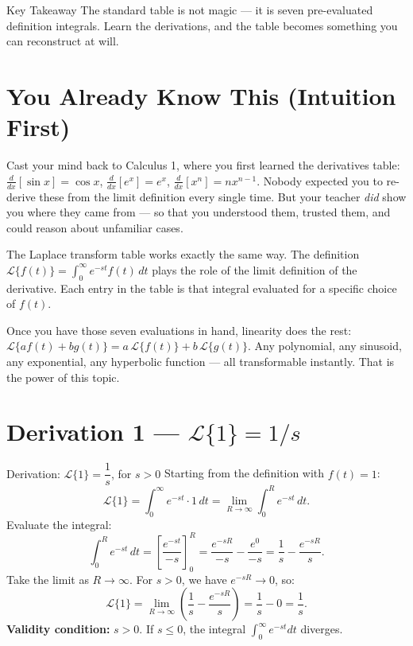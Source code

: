 \documentclass[12pt,a4paper]{article}
\begin{document}
\begin{learnbox}{Key Takeaway}
The standard table is not magic --- it is seven pre-evaluated definition integrals.
Learn the derivations, and the table becomes something you can reconstruct at will.
\end{learnbox}

\section{You Already Know This (Intuition First)}

Cast your mind back to Calculus 1, where you first learned the derivatives table:
$\frac{d}{dx}[\sin x] = \cos x$, $\frac{d}{dx}[e^x] = e^x$, $\frac{d}{dx}[x^n] = nx^{n-1}$.
Nobody expected you to re-derive these from the limit definition every single time.
But your teacher \emph{did} show you where they came from --- so that you understood them,
trusted them, and could reason about unfamiliar cases.

The Laplace transform table works exactly the same way. The definition
$\mathcal{L}\{f(t)\} = \int_0^\infty e^{-st} f(t)\, dt$ plays the role of the limit
definition of the derivative. Each entry in the table is that integral evaluated for
a specific choice of $f(t)$.

Once you have those seven evaluations in hand, linearity does the rest:
$\mathcal{L}\{af(t) + bg(t)\} = a\,\mathcal{L}\{f(t)\} + b\,\mathcal{L}\{g(t)\}$.
Any polynomial, any sinusoid, any exponential, any hyperbolic function --- all
transformable instantly. That is the power of this topic.

\section{Derivation 1 --- \texorpdfstring{$\mathcal{L}\{1\} = 1/s$}{L{1} = 1/s}}

\begin{infobox}{Derivation: $\mathcal{L}\{1\} = \dfrac{1}{s}$, for $s > 0$}
Starting from the definition with $f(t) = 1$:
\[
  \mathcal{L}\{1\} = \int_0^\infty e^{-st} \cdot 1 \, dt
  = \lim_{R \to \infty} \int_0^R e^{-st} \, dt.
\]
Evaluate the integral:
\[
  \int_0^R e^{-st} \, dt
  = \left[ \frac{e^{-st}}{-s} \right]_0^R
  = \frac{e^{-sR}}{-s} - \frac{e^{0}}{-s}
  = \frac{1}{s} - \frac{e^{-sR}}{s}.
\]
Take the limit as $R \to \infty$. For $s > 0$, we have $e^{-sR} \to 0$, so:
\[
  \mathcal{L}\{1\} = \lim_{R \to \infty}\left(\frac{1}{s} - \frac{e^{-sR}}{s}\right)
  = \frac{1}{s} - 0 = \boxed{\frac{1}{s}}.
\]
\textbf{Validity condition:} $s > 0$. If $s \leq 0$, the integral $\int_0^\infty e^{-st} dt$
diverges.
\end{infobox}
\end{document}

